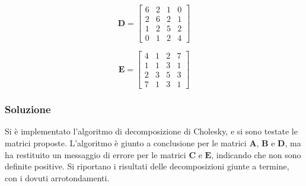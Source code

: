 \documentclass[letterpaper, 12pt]{article}
\numberwithin{equation}{section}    %
\begin{document}
\begin{center}
    \begin{minipage}{0.48\textwidth}
    \centering
    \[
    \mathbf{D} =
    \begin{bmatrix}
    6 & 2 & 1 & 0 \\
    2 & 6 & 2 & 1 \\
    1 & 2 & 5 & 2 \\
    0 & 1 & 2 & 4
    \end{bmatrix}
    \]
    \end{minipage}
    \hfill
    \begin{minipage}{0.48\textwidth}
    \centering
    \[
    \mathbf{E} =
    \begin{bmatrix}
    4 & 1 & 2 & 7 \\
    1 & 1 & 3 & 1 \\
    2 & 3 & 5 & 3 \\
    7 & 1 & 3 & 1
    \end{bmatrix}
    \]
    \end{minipage}
\end{center}

\subsubsection{Soluzione}
Si è implementato l'algoritmo di decomposizione di Cholesky, e si sono testate le matrici proposte. L'algoritmo
è giunto a conclusione per le matrici $\mathbf{A}$, $\mathbf{B}$ e $\mathbf{D}$, ma ha restituito un messaggio di
errore per le matrici $\mathbf{C}$ e $\mathbf{E}$, indicando che non sono definite positive. 
Si riportano i risultati delle decomposizioni giunte a termine, con i dovuti arrotondamenti. 
\end{document}

